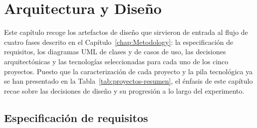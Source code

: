 
\chapter{Arquitectura y Diseño} \label{chap:Design}

Este capítulo recoge los artefactos de diseño que sirvieron de entrada al flujo de cuatro fases descrito en el Capítulo~\ref{chap:Metodology}: la especificación de requisitos, los diagramas UML \cite{Fowler:2004:UML} de clases y de casos de uso, las decisiones arquitectónicas y las tecnologías seleccionadas para cada uno de los cinco proyectos. 
Puesto que la caracterización de cada proyecto y la pila tecnológica ya se han presentado en la Tabla~\ref{tab:proyectos-resumen}, el énfasis de este capítulo recae sobre las decisiones de diseño y su progresión a lo largo del experimento.

\section{Especificación de requisitos} \label{sec:requirements}

